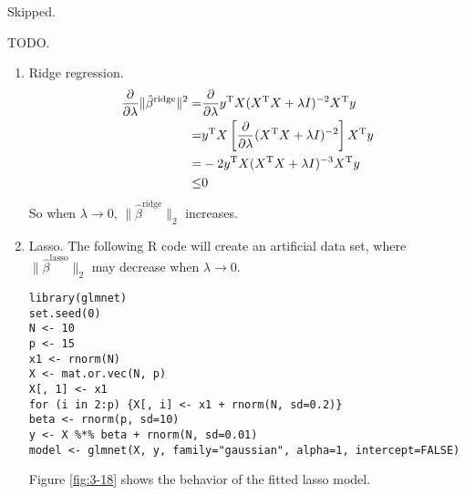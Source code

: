 \begin{sol}
Skipped.
\end{sol}

\begin{sol}
	TODO.
\end{sol}

\begin{sol}
\begin{enumerate}
\item Ridge regression.
\begin{align*}
	\frac{\partial}{\partial \lambda}\|\hat{\beta}^{\mathrm{ridge}}\|^2 = & \frac{\partial}{\partial \lambda}y^{\mathrm{T}}X(X^{\mathrm{T}}X+\lambda I)^{-2}X^{\mathrm{T}}y\\
	=& y^{\mathrm{T}}X\left[\frac{\partial}{\partial \lambda} (X^{\mathrm{T}}X+\lambda I)^{-2}\right]X^{\mathrm{T}}y\\
	=& -2y^{\mathrm{T}}X(X^{\mathrm{T}}X+\lambda I)^{-3}X^{\mathrm{T}}y\\
	\le & 0
\end{align*}
So when $\lambda\to 0$, $\|\hat{\beta}^{\mathrm{ridge}}\|_2$ increases.

\item Lasso. The following R code will create an artificial data set, where $\|\hat{\beta}^{\mathrm{lasso}}\|_2$ may decrease when $\lambda\to 0$.
\begin{verbatim}
library(glmnet)
set.seed(0)
N <- 10
p <- 15
x1 <- rnorm(N)
X <- mat.or.vec(N, p)
X[, 1] <- x1
for (i in 2:p) {X[, i] <- x1 + rnorm(N, sd=0.2)}
beta <- rnorm(p, sd=10)
y <- X %*% beta + rnorm(N, sd=0.01)
model <- glmnet(X, y, family="gaussian", alpha=1, intercept=FALSE)
\end{verbatim}

Figure \ref{fig:3-18} shows the behavior of the fitted lasso model.\\


\end{enumerate}
\end{sol}
